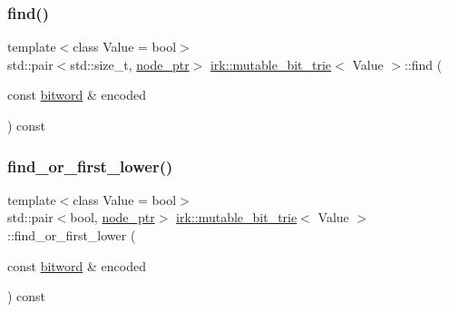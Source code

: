 \mbox{\label{classirk_1_1mutable__bit__trie_af0bd766c6c437fcdcb9612ba9de84510}} 
\subsubsection{\texorpdfstring{find()}{find()}}
{\footnotesize\ttfamily template$<$class Value = bool$>$ \\
std\+::pair$<$std\+::size\+\_\+t, \mbox{\hyperlink{classirk_1_1mutable__bit__trie_abd23179ac4f02a981d4f47b4c0652287}{node\+\_\+ptr}}$>$ \mbox{\hyperlink{classirk_1_1mutable__bit__trie}{irk\+::mutable\+\_\+bit\+\_\+trie}}$<$ Value $>$\+::find (\begin{DoxyParamCaption}\item[{const \mbox{\hyperlink{namespaceirk_a5d1a67079cf6423ecaededebe848f083}{bitword}} \&}]{encoded }\end{DoxyParamCaption}) const\hspace{0.3cm}{\ttfamily [inline]}}

\mbox{\label{classirk_1_1mutable__bit__trie_a30d25f61a4f6e7cb8d9ac6f0ff205f97}} 
\subsubsection{\texorpdfstring{find\+\_\+or\+\_\+first\+\_\+lower()}{find\_or\_first\_lower()}}
{\footnotesize\ttfamily template$<$class Value = bool$>$ \\
std\+::pair$<$bool, \mbox{\hyperlink{classirk_1_1mutable__bit__trie_abd23179ac4f02a981d4f47b4c0652287}{node\+\_\+ptr}}$>$ \mbox{\hyperlink{classirk_1_1mutable__bit__trie}{irk\+::mutable\+\_\+bit\+\_\+trie}}$<$ Value $>$\+::find\+\_\+or\+\_\+first\+\_\+lower (\begin{DoxyParamCaption}\item[{const \mbox{\hyperlink{namespaceirk_a5d1a67079cf6423ecaededebe848f083}{bitword}} \&}]{encoded }\end{DoxyParamCaption}) const\hspace{0.3cm}{\ttfamily [inline]}}

